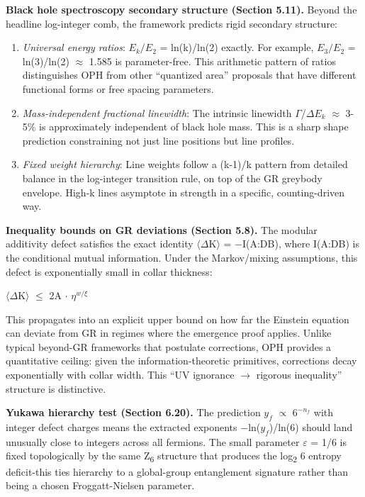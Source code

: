 \documentclass[11pt,a4paper]{article}
\theoremstyle{remark}
\begin{document}
\textbf{Black hole spectroscopy secondary structure (Section 5.11).} Beyond the headline log-integer comb, the framework predicts rigid secondary structure:

\begin{enumerate}
\def\labelenumi{\arabic{enumi}.}
\item
  \emph{Universal energy ratios}: \(E_k/E_2\) = ln(k)/ln(2) exactly. For example, \(E_3/E_2\) = ln(3)/ln(2) \ensuremath{\approx} 1.585 is parameter-free. This arithmetic pattern of ratios distinguishes OPH from other ``quantized area'' proposals that have different functional forms or free spacing parameters.
\item
  \emph{Mass-independent fractional linewidth}: The intrinsic linewidth \ensuremath{\Gamma}/\(\ensuremath{\Delta}E_k\) \ensuremath{\approx} 3-5\% is approximately independent of black hole mass. This is a sharp shape prediction constraining not just line positions but line profiles.
\item
  \emph{Fixed weight hierarchy}: Line weights follow a (k-1)/k pattern from detailed balance in the log-integer transition rule, on top of the GR greybody envelope. High-k lines asymptote in strength in a specific, counting-driven way.
\end{enumerate}

\textbf{Inequality bounds on GR deviations (Section 5.8).} The modular additivity defect satisfies the exact identity \ensuremath{\langle}\ensuremath{\Delta}K\ensuremath{\rangle} = \ensuremath{-}I(A:D\textbar B), where I(A:D\textbar B) is the conditional mutual information. Under the Markov/mixing assumptions, this defect is exponentially small in collar thickness:

\textbar\ensuremath{\langle}\ensuremath{\Delta}K\ensuremath{\rangle}\textbar{} \ensuremath{\leq} 2\textbar A\textbar{} \ensuremath{\cdot} \(\ensuremath{\eta}^{w/\ensuremath{\xi}}\)

This propagates into an explicit upper bound on how far the Einstein equation can deviate from GR in regimes where the emergence proof applies. Unlike typical beyond-GR frameworks that postulate corrections, OPH provides a quantitative ceiling: given the information-theoretic primitives, corrections decay exponentially with collar width. This ``UV ignorance \ensuremath{\to} rigorous inequality'' structure is distinctive.

\textbf{Yukawa hierarchy test (Section 6.20).} The prediction \(y_f\) \ensuremath{\propto} \(6^{\ensuremath{-}n_f}\) with integer defect charges means the extracted exponents \ensuremath{-}ln(\(y_f\))/ln(6) should land unusually close to integers across all fermions. The small parameter \ensuremath{\varepsilon} = 1/6 is fixed topologically by the same Z\textsubscript{6} structure that produces the log\textsubscript{2} 6 entropy deficit-this ties hierarchy to a global-group entanglement signature rather than being a chosen Froggatt-Nielsen parameter.
\end{document}

